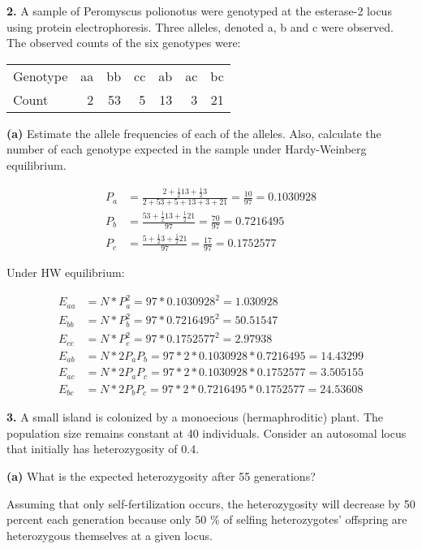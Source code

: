 \documentclass{essay}
\begin{document}
\begin{essaystyle}
\textbf{2.} A sample of Peromyscus polionotus were genotyped at the esterase-2
locus using protein electrophoresis. Three alleles, denoted a, b and c were
observed. The observed counts of the six genotypes were:

\begin{tabular}{l | r r r r r r}
Genotype & aa & bb & cc & ab & ac & bc \\
Count    & 2  & 53 & 5  & 13 & 3  & 21 \\
\end{tabular}

\textbf{(a)} Estimate the allele frequencies of each of the alleles. Also, calculate the
number of each genotype expected in the sample under Hardy-Weinberg
equilibrium. 

\begin{align}
P_a &= \frac{2 + \frac{1}{2} 13 + \frac{1}{2} 3}{2 + 53 + 5 + 13 + 3 + 21} = \frac{10}{97} = 0.1030928 \\
P_b &= \frac{53 + \frac{1}{2} 13 + \frac{1}{2} 21}{97} = \frac{70}{97} = 0.7216495 \\
P_c &= \frac{5 + \frac{1}{2} 3 + \frac{1}{2} 21}{97} = \frac{17}{97} = 0.1752577
\end{align}

Under HW equilibrium:

\begin{align}
E_{aa} &= N * P_a^2 = 97 * 0.1030928^2 = 1.030928 \\
E_{bb} &= N * P_b^2 = 97 * 0.7216495^2 = 50.51547 \\
E_{cc} &= N * P_c^2 = 97 * 0.1752577^2 = 2.97938 \\
E_{ab} &= N * 2P_a P_b = 97 * 2 * 0.1030928 * 0.7216495 = 14.43299 \\
E_{ac} &= N * 2P_a P_c = 97 * 2 * 0.1030928 * 0.1752577 = 3.505155 \\
E_{bc} &= N * 2P_b P_c = 97 * 2 * 0.7216495 * 0.1752577 = 24.53608
\end{align}


\textbf{3.} A small island is colonized by a monoecious (hermaphroditic) plant.
The population size remains constant at 40 individuals. Consider an autosomal
locus that initially has heterozygosity of 0.4. 

\textbf{(a)} What is the expected heterozygosity after 55 generations?

Assuming that only self-fertilization occurs, the heterozygosity will decrease
by 50 percent each generation because only 50 \% of selfing heterozygotes'
offspring are heterozygous themselves at a given locus.


\end{essaystyle}
\end{document}
